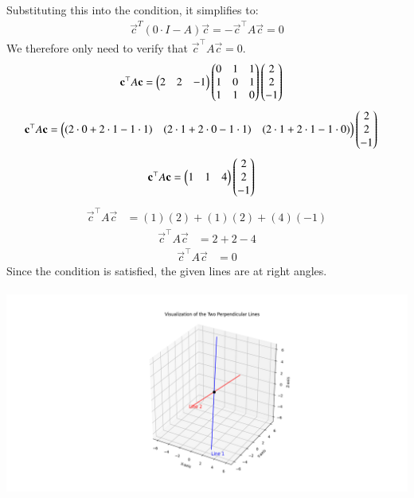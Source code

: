 \documentclass[journal]{IEEEtran}
\begin{document}
Substituting this into the condition, it simplifies to:
\begin{align}
    \vec{c}^T (0 \cdot I - A) \vec{c} = -\vec{c}^\top A \vec{c} = 0
\end{align}
We therefore only need to verify that $\vec{c}^\top A \vec{c} = 0$. 
\begin{align}
   \mathbf{c}^\top A \mathbf{c} &= \begin{pmatrix} 2 & 2 & -1\end{pmatrix} \begin{pmatrix}0 & 1 & 1 \\ 1 & 0 & 1 \\ 1 & 1 & 0\end{pmatrix} \begin{pmatrix}2 \\ 2 \\ -1\end{pmatrix} 
\end{align}
\begin{align}
    \mathbf{c}^\top A \mathbf{c}&= \begin{pmatrix}(2 \cdot 0 + 2 \cdot 1 - 1 \cdot 1) & (2 \cdot 1 + 2 \cdot 0 - 1 \cdot 1) & (2 \cdot 1 + 2 \cdot 1 - 1 \cdot 0)\end{pmatrix}   \begin{pmatrix}2 \\ 2 \\ -1\end{pmatrix} 
\end{align}
\begin{align}
    \mathbf{c}^\top A \mathbf{c}&= \begin{pmatrix}1 & 1 & 4\end{pmatrix} \begin{pmatrix}2 \\ 2 \\ -1\end{pmatrix} 
\end{align}
\begin{align}
    \vec{c}^\top A \vec{c}&= (1)(2) + (1)(2) + (4)(-1) 
\end{align}
\begin{align}
    \vec{c}^\top A \vec{c}&= 2 + 2 - 4 
\end{align}
\begin{align} 
    \vec{c}^\top A \vec{c}&= 0
\end{align}
Since the condition is satisfied, the given lines are at right angles.\\\\

    \centering   \includegraphics[width=\columnwidth, height=1\textheight, keepaspectratio]{figs/fig1.png} 
\end{document}
